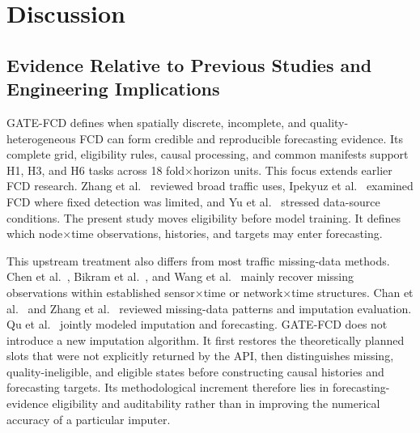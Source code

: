 \documentclass[pdflatex,sn-mathphys-num,iicol]{sn-jnl}
\begin{document}
\FloatBarrier



\section{Discussion}
\label{sec:discussion}



\subsection{Evidence Relative to Previous Studies and Engineering Implications}
\label{subsec:evidence-engineering}

GATE-FCD defines when spatially discrete, incomplete, and quality-heterogeneous FCD can form credible and reproducible forecasting evidence. Its complete grid, eligibility rules, causal processing, and common manifests support H1, H3, and H6 tasks across 18 fold$\times$horizon units. This focus extends earlier FCD research. Zhang et al.~\cite{Zhang2025FCD} reviewed broad traffic uses, Ipekyuz et al.~\cite{Ipekyuz2025FCD} examined FCD where fixed detection was limited, and Yu et al.~\cite{Yu2024AutoformerFCD} stressed data-source conditions. The present study moves eligibility before model training. It defines which node$\times$time observations, histories, and targets may enter forecasting.

This upstream treatment also differs from most traffic missing-data methods. Chen et al.~\cite{Chen2024TrafficCompletion}, Bikram et al.~\cite{Bikram2024Imputation}, and Wang et al.~\cite{Wang2024RoadNetworkPixelization} mainly recover missing observations within established sensor$\times$time or network$\times$time structures. Chan et al.~\cite{Chan2023MissingTrafficData} and Zhang et al.~\cite{Zhang2024MissingData} reviewed missing-data patterns and imputation evaluation. Qu et al.~\cite{Qu2024TrafficPredictionImputation} jointly modeled imputation and forecasting. GATE-FCD does not introduce a new imputation algorithm. It first restores the theoretically planned slots that were not explicitly returned by the API, then distinguishes missing, quality-ineligible, and eligible states before constructing causal histories and forecasting targets. Its methodological increment therefore lies in forecasting-evidence eligibility and auditability rather than in improving the numerical accuracy of a particular imputer.
\end{document}

